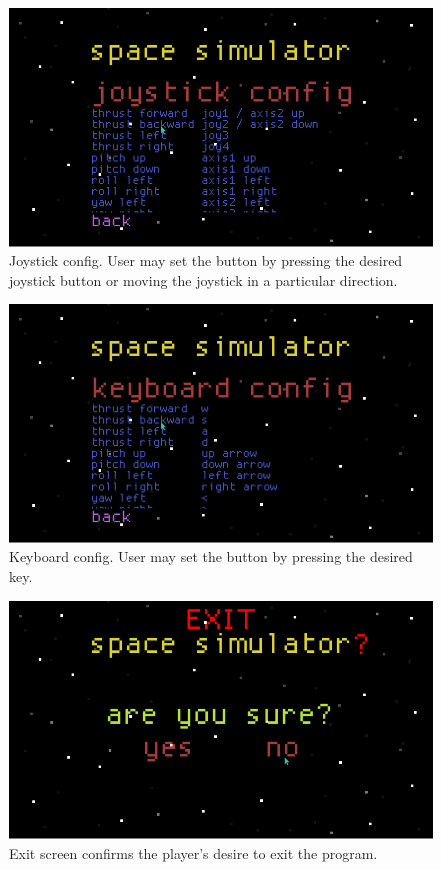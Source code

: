\begin{figure}[H]
  \centering
  \includegraphics[scale=0.5]{../images/07-joystick_config.png}
  \caption{Joystick config.  User may set the button by pressing the desired joystick button or moving the joystick in a particular direction.}
\end{figure}

\begin{figure}[H]
  \centering
  \includegraphics[scale=0.5]{../images/08-keyboard_config.png}
  \caption{Keyboard config.  User may set the button by pressing the desired key.}
\end{figure}

\begin{figure}[H]
  \centering
  \includegraphics[scale=0.5]{../images/09-exit.png}
  \caption{Exit screen confirms the player's desire to exit the program.}
\end{figure}





